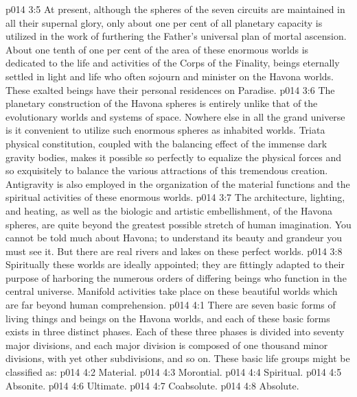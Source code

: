 \vs p014 3:5 At present, although the spheres of the seven circuits are maintained in all their supernal glory, only about one per cent of all planetary capacity is utilized in the work of furthering the Father’s universal plan of mortal ascension. About one tenth of one per cent of the area of these enormous worlds is dedicated to the life and activities of the Corps of the Finality, beings eternally settled in light and life who often sojourn and minister on the Havona worlds. These exalted beings have their personal residences on Paradise.
\vs p014 3:6 The planetary construction of the Havona spheres is entirely unlike that of the evolutionary worlds and systems of space. Nowhere else in all the grand universe is it convenient to utilize such enormous spheres as inhabited worlds. Triata physical constitution, coupled with the balancing effect of the immense dark gravity bodies, makes it possible so perfectly to equalize the physical forces and so exquisitely to balance the various attractions of this tremendous creation. Antigravity is also employed in the organization of the material functions and the spiritual activities of these enormous worlds.
\vs p014 3:7 The architecture, lighting, and heating, as well as the biologic and artistic embellishment, of the Havona spheres, are quite beyond the greatest possible stretch of human imagination. You cannot be told much about Havona; to understand its beauty and grandeur you must see it. But there are real rivers and lakes on these perfect worlds.
\vs p014 3:8 Spiritually these worlds are ideally appointed; they are fittingly adapted to their purpose of harboring the numerous orders of differing beings who function in the central universe. Manifold activities take place on these beautiful worlds which are far beyond human comprehension.
\vs p014 4:1 There are seven basic forms of living things and beings on the Havona worlds, and each of these basic forms exists in three distinct phases. Each of these three phases is divided into seventy major divisions, and each major division is composed of one thousand minor divisions, with yet other subdivisions, and so on. These basic life groups might be classified as:
\vs p014 4:2 \bibnobreakspace Material.
\vs p014 4:3 \bibnobreakspace Morontial.
\vs p014 4:4 \bibnobreakspace Spiritual.
\vs p014 4:5 \bibnobreakspace Absonite.
\vs p014 4:6 \bibnobreakspace Ultimate.
\vs p014 4:7 \bibnobreakspace Coabsolute.
\vs p014 4:8 \bibnobreakspace Absolute.
